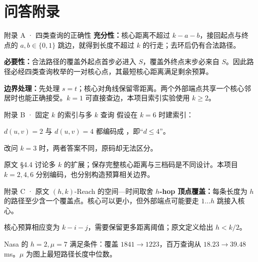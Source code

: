 \section{问答附录}

\begin{frame}{附录 A · 四类查询的正确性}
\fontsize{11}{14}\selectfont
\textbf{充分性：}核心距离不超过 $k-a-b$，接回起点与终点的 $a,b\in\{0,1\}$ 跳边，就得到长度不超过 $k$ 的行走；去环后仍有合法路径。\par\vspace{2mm}
\textbf{必要性：}合法路径的覆盖外起点首步必进入 $S$，覆盖外终点末步必来自 $S$。因此路径必经四类查询枚举的一对核心点，其最短核心距离满足剩余预算。\par\vspace{2mm}
\textbf{边界处理：}先处理 $s=t$；核心对角线保留零距离。两个外部端点共享一个核心邻居时也能正确接受。$k=1$ 可直接查边，本项目索引实验使用 $k\ge2$。
\end{frame}

\begin{frame}{附录 B · 固定 $k$ 的索引与多 $k$ 查询}
假设在 $k=6$ 时建索引：\par\vspace{2mm}
$d(u,v)=2$ 与 $d(u,v)=4$ 都编码成 ，即“$d\le4$”。\par\vspace{2mm}
改问 $k=3$ 时，两者答案不同，原码却无法区分。\par\vspace{3mm}
原文 §4.4 讨论多 $k$ 的扩展；保存完整核心距离与三档码是不同设计。本项目 $k=2,4,6$ 分别编码，也分别构造预算相关边界。
\end{frame}

\begin{frame}{附录 C · 原文 $(h,k)$-Reach 的空间—时间取舍}
\fontsize{11}{14}\selectfont
\textbf{$h$-hop 顶点覆盖：}每条长度为 $h$ 的路径至少含一个覆盖点。核心可以更小，但外部端点可能要走 $1\ldots h$ 跳接入核心。\par\vspace{2mm}
核心预算相应变为 $k-i-j$，需要保留更多距离阈值；原文定义给出 $h<k/2$。\par\vspace{2mm}
Nasa 的 $h=2,\mu=7$ 满足条件：覆盖 $1841\to1223$，百万查询从 $18.23\to39.48$ms。$\mu$ 为图上最短路径长度中位数。
\end{frame}

